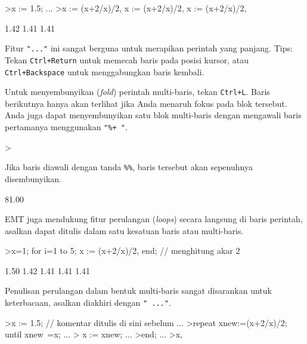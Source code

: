 \documentclass[a4paper,11pt,oneside,enabledeprecatedfontcommands]{scrbook}
\newenvironment{eulernotebook}{}{}
\newenvironment{eulercomment}{\par\medskip\noindent}{\par\medskip}
\begin{document}
\begin{eulernotebook}
\begin{eulercomment}
\end{eulercomment}
\begin{eulerprompt}
>x := 1.5; ...
>x := (x+2/x)/2, x := (x+2/x)/2, x := (x+2/x)/2, 
\end{eulerprompt}
\begin{euleroutput}
       1.42 
       1.41 
       1.41 
\end{euleroutput}
\begin{eulercomment}
Fitur \texttt{"..."} ini sangat berguna untuk merapikan perintah yang panjang. Tips: Tekan \texttt{Ctrl+Return} untuk memecah baris pada posisi kursor, atau \texttt{Ctrl+Backspace} untuk menggabungkan baris kembali.

Untuk menyembunyikan (\emph{fold}) perintah multi-baris, tekan \texttt{Ctrl+L}. Baris berikutnya hanya akan terlihat jika Anda menaruh fokus pada blok tersebut. Anda juga dapat menyembunyikan satu blok multi-baris dengan mengawali baris pertamanya menggunakan \texttt{"\%+ "}.
\end{eulercomment}
\begin{eulerprompt}
>%
\end{eulerprompt}
\begin{eulercomment}
Jika baris diawali dengan tanda \texttt{\%\%}, baris tersebut akan sepenuhnya disembunyikan.
\end{eulercomment}
\begin{euleroutput}
      81.00 
\end{euleroutput}
\begin{eulercomment}
EMT juga mendukung fitur perulangan (\emph{loops}) secara langsung di baris perintah, asalkan dapat ditulis dalam satu kesatuan baris atau multi-baris.
\end{eulercomment}
\begin{eulerprompt}
>x=1; for i=1 to 5; x := (x+2/x)/2, end; // menghitung akar 2
\end{eulerprompt}
\begin{euleroutput}
       1.50 
       1.42 
       1.41 
       1.41 
       1.41 
\end{euleroutput}
\begin{eulercomment}
Penulisan perulangan dalam bentuk multi-baris sangat disarankan untuk keterbacaan, asalkan diakhiri dengan \texttt{" ..."}.
\end{eulercomment}
\begin{eulerprompt}
>x := 1.5; // komentar ditulis di sini sebelum ...
>repeat xnew:=(x+2/x)/2; until xnew~=x; ...
>   x := xnew; ...
>end; ...
>x,
\end{eulerprompt}

\end{eulernotebook}
\end{document}
